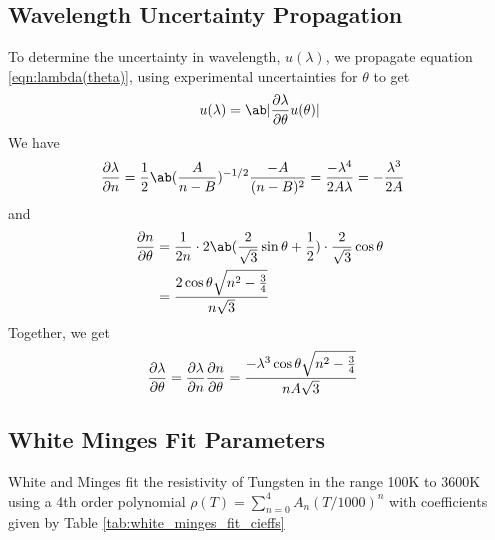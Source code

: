 \documentclass[
	a4paper, %
	10pt, %
	twoside, %
]{journal}
\begin{document}
\subsection{Wavelength Uncertainty Propagation}
\label{appendix:wavelength-uncertainty-prop}
To determine the uncertainty in wavelength, $u(\lambda)$, we propagate equation \ref{eqn:lambda(theta)}, using experimental uncertainties for $\theta$ to get 
\begin{equation}
    u(\lambda) = \ab|\diffp{\lambda}{\theta} u(\theta)|
\end{equation}
We have 
\begin{align*}
    \diffp{\lambda}{n}
    &= \frac12\ab(\frac{A}{n - B})^{-1/2} \frac{-A}{(n - B)^2} = \frac{-\lambda^4}{2A\lambda} = -\frac{\lambda^3}{2A}
\end{align*}
and 
\begin{align*}
    \diffp{n}{\theta}
    &= \frac1{2n}\cdot 2\ab(\frac2{\sqrt3}\sin\theta + \frac12)\cdot \frac2{\sqrt3}\cos\theta \\ 
    &= \frac{2\cos\theta\sqrt{n^2 - \frac34}}{n\sqrt 3}
\end{align*}
Together, we get 
\begin{align}
\label{eqn:dlambda_dtheta}
    \diffp{\lambda}{\theta} &= \diffp{\lambda}{n} \diffp{n}{\theta} = \frac{-\lambda^3\cos\theta\sqrt{n^2 - \frac34}}{nA\sqrt 3}
\end{align}

\subsection{White Minges Fit Parameters}
\label{appendix:white-minges-fit-parameters}
White and Minges fit the resistivity of Tungsten in the range 100K to 3600K using a 4th order polynomial $\rho(T) = \sum_{n = 0}^4A_n(T/1000)^n$ with coefficients given by Table \ref{tab:white_minges_fit_cieffs}
\end{document}
